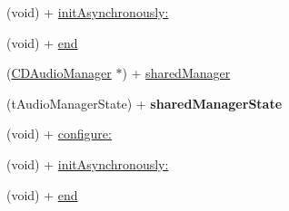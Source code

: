 \begin{DoxyCompactItemize}
\item 
(void) + \hyperlink{interfaceCDAudioManager_a208d173cd07d3ace248aff4bb16839b9}{init\+Asynchronously\+:}
\item 
(void) + \hyperlink{interfaceCDAudioManager_a0d1e25778a1823456c3d65219a7d0562}{end}
\item 
(\hyperlink{interfaceCDAudioManager}{C\+D\+Audio\+Manager} $\ast$) + \hyperlink{interfaceCDAudioManager_a757b69bd4a902166b3ffa81ea85ba6e8}{shared\+Manager}
\item 
\mbox{\label{interfaceCDAudioManager_a836401e9feed55d2276e880e5aca13fa}} 
(t\+Audio\+Manager\+State) + {\bfseries shared\+Manager\+State}
\item 
(void) + \hyperlink{interfaceCDAudioManager_a4565c81bdaefd40cad943440c7a438ab}{configure\+:}
\item 
(void) + \hyperlink{interfaceCDAudioManager_a208d173cd07d3ace248aff4bb16839b9}{init\+Asynchronously\+:}
\item 
(void) + \hyperlink{interfaceCDAudioManager_a0d1e25778a1823456c3d65219a7d0562}{end}
\end{DoxyCompactItemize}
